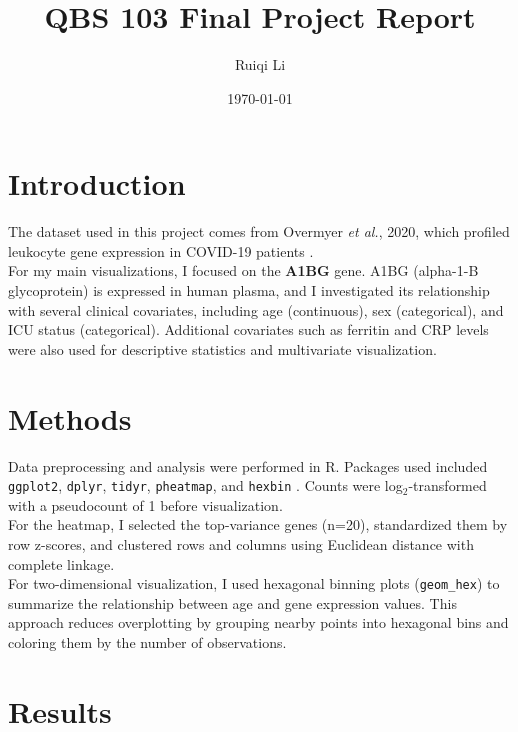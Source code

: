 \documentclass[11pt]{article}
\title{QBS 103 Final Project Report}
\author{Ruiqi Li}
\date{\today}
\begin{document}
\maketitle

\section{Introduction}
The dataset used in this project comes from Overmyer \textit{et al.}, 2020, which profiled leukocyte gene expression in COVID-19 patients \citep{overmyer_large-scale_2021}. \\
For my main visualizations, I focused on the \textbf{A1BG} gene. A1BG (alpha-1-B glycoprotein) is expressed in human plasma, and I investigated its relationship with several clinical covariates, including age (continuous), sex (categorical), and ICU status (categorical). Additional covariates such as ferritin and CRP levels were also used for descriptive statistics and multivariate visualization. 

\section{Methods}
Data preprocessing and analysis were performed in R. Packages used included \texttt{ggplot2}, \texttt{dplyr}, \texttt{tidyr}, \texttt{pheatmap}, and \texttt{hexbin} \citep{ggplot22016,dplyr2023,R-tidyr,pheatmap2019,hexbin2022}. 
Counts were log$_2$-transformed with a pseudocount of 1 before visualization. \\
For the heatmap, I selected the top-variance genes (n=20), standardized them by row z-scores, and clustered rows and columns using Euclidean distance with complete linkage. \\
For two-dimensional visualization, I used hexagonal binning plots (\texttt{geom\_hex}) to summarize the relationship between age and gene expression values. This approach reduces overplotting by grouping nearby points into hexagonal bins and coloring them by the number of observations.



\section{Results}
\end{document}
